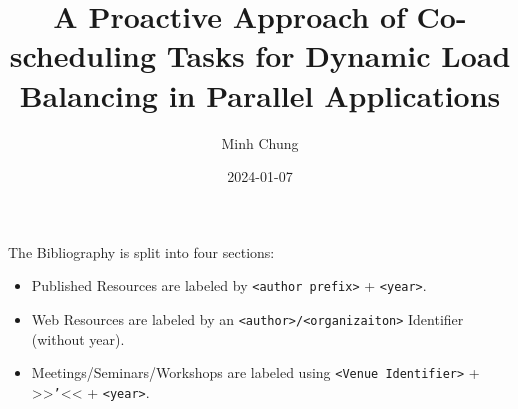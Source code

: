 \documentclass[a4paper,10pt,twoside,DIV=14,BCOR=14mm,appendixprefix]{scrbook}
\title{\LARGE A Proactive Approach of Co-scheduling Tasks for Dynamic Load Balancing in Parallel Applications}
\author{Minh Chung}
\date{2024-01-07} %
\theoremstyle{def}
\begin{document}
\frontmatter
\maketitle
\makeerklaerung
{}
\cleardoublepage
{}
{}
\tableofcontents
\listoffigures
\listoftables
%


\mainmatter
\glsresetall









\cleardoubleoddpage
\blankpage
\clearpage

\appendix




\backmatter

\printglossary[type=\acronymtype,title={Acronyms and Abbreviations}, style={mcolindex}] %
\printglossary[]
\cleardoubleoddpage

\printbibheading
{}
The Bibliography is split into four sections:\\
\begin{itemize}
    \item Published Resources are labeled by \texttt{<author prefix>} + \texttt{<year>}.
    \item Web Resources are labeled by an \texttt{<author>/<organizaiton>} Identifier (without year).
    \item Meetings/Seminars/Workshops are labeled using \texttt{<Venue Identifier>} + >>\texttt{'}<< + \texttt{<year>}.
\end{itemize}
\end{document}
